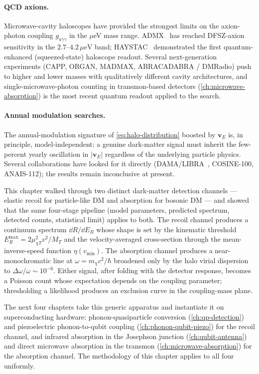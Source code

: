\paragraph{QCD axions.}
Microwave-cavity haloscopes have provided the strongest limits on
the axion-photon coupling $g_{a\gamma\gamma}$ in the $\mu$eV mass
range. ADMX~\cite{admx2018} has reached DFSZ-axion sensitivity in
the $2.7$--$4.2\,\mu\text{eV}$ band; HAYSTAC~\cite{haystac2021}
demonstrated the first quantum-enhanced (squeezed-state)
haloscope readout. Several next-generation experiments (CAPP,
ORGAN, MADMAX, ABRACADABRA / DMRadio) push to higher and lower
masses with qualitatively different cavity architectures, and
single-microwave-photon counting in transmon-based detectors
(\cref{ch:microwave-absorption}) is the most recent quantum
readout applied to the search.

\paragraph{Annual modulation searches.}
The annual-modulation signature of \cref{eq:halo-distribution}
boosted by $\bm v_E$ is, in principle, model-independent: a
genuine dark-matter signal must inherit the few-percent yearly
oscillation in $|\bm v_E|$ regardless of the underlying particle
physics. Several collaborations have looked for it directly
(DAMA/LIBRA~\cite{dama2018}, COSINE-100, ANAIS-112); the results
remain inconclusive at present.

This chapter walked through two distinct dark-matter detection
channels --- elastic recoil for particle-like DM and absorption for
bosonic DM --- and showed that the same four-stage pipeline (model
parameters, predicted spectrum, detected counts, statistical limit)
applies to both. The recoil channel produces a continuum spectrum
$\dd R/\dd E_R$ whose shape is set by the kinematic threshold
$E_R^\text{max}=2\mu_{\chi T}^2 v^2/M_T$ and the velocity-averaged
cross-section through the mean-inverse-speed function $\eta(v_\text{min})$.
The absorption channel produces a near-monochromatic line at
$\omega=m_\chi c^2/\hbar$ broadened only by the halo virial
dispersion to $\Delta\omega/\omega\sim 10^{-6}$. Either signal,
after folding with the detector response, becomes a Poisson count
whose expectation depends on the coupling parameter; thresholding a
likelihood produces an exclusion curve in the coupling-mass plane.

The next four chapters take this generic apparatus and instantiate
it on superconducting hardware: phonon-quasiparticle conversion
(\cref{ch:qp-detection}) and piezoelectric phonon-to-qubit coupling
(\cref{ch:phonon-qubit-piezo}) for the recoil channel, and
infrared absorption in the Josephson junction
(\cref{ch:qubit-antenna}) and direct microwave absorption in the
transmon (\cref{ch:microwave-absorption}) for the absorption
channel. The methodology of this chapter applies to all four
uniformly.

